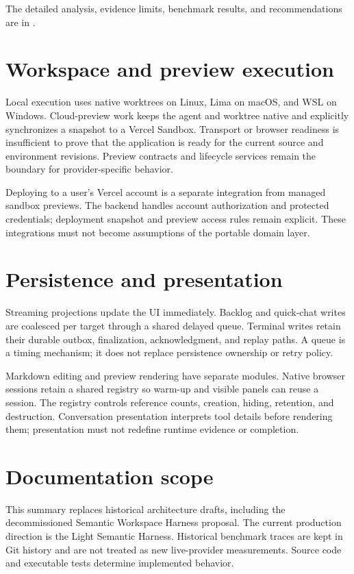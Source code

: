 \documentclass[11pt,a4paper]{article}
\newcommand{\code}[1]{\texttt{\detokenize{#1}}}
\begin{document}
The detailed analysis, evidence limits, benchmark results, and recommendations
are in \code{docs/semantic-harness-study.tex}.

\section{Workspace and preview execution}
Local execution uses native worktrees on Linux, Lima on macOS, and WSL on
Windows. Cloud-preview work keeps the agent and worktree native and explicitly
synchronizes a snapshot to a Vercel Sandbox. Transport or browser readiness is
insufficient to prove that the application is ready for the current source and
environment revisions. Preview contracts and lifecycle services remain the
boundary for provider-specific behavior.

Deploying to a user's Vercel account is a separate integration from managed
sandbox previews. The backend handles account authorization and protected
credentials; deployment snapshot and preview access rules remain explicit.
These integrations must not become assumptions of the portable domain layer.

\section{Persistence and presentation}
Streaming projections update the UI immediately. Backlog and quick-chat writes
are coalesced per target through a shared delayed queue. Terminal writes retain
their durable outbox, finalization, acknowledgment, and replay paths. A queue is
a timing mechanism; it does not replace persistence ownership or retry policy.

Markdown editing and preview rendering have separate modules. Native browser
sessions retain a shared registry so warm-up and visible panels can reuse a
session. The registry controls reference counts, creation, hiding, retention,
and destruction. Conversation presentation interprets tool details before
rendering them; presentation must not redefine runtime evidence or completion.

\section{Documentation scope}
This summary replaces historical architecture drafts, including the
decommissioned Semantic Workspace Harness proposal. The current production
direction is the Light Semantic Harness. Historical benchmark traces are kept
in Git history and are not treated as new live-provider measurements.
Source code and executable tests determine implemented behavior.
\end{document}
